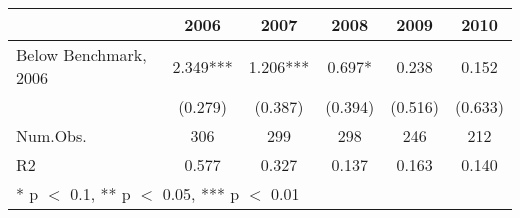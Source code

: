 \begin{table}
\centering
\begin{tabular}[t]{lccccc}
\toprule
  & 2006 & 2007 & 2008 & 2009 & 2010\\
\midrule
Below Benchmark, 2006 & \num{2.349}*** & \num{1.206}*** & \num{0.697}* & \num{0.238} & \num{0.152}\\
 & (\num{0.279}) & (\num{0.387}) & (\num{0.394}) & (\num{0.516}) & (\num{0.633})\\
\midrule
Num.Obs. & \num{306} & \num{299} & \num{298} & \num{246} & \num{212}\\
R2 & \num{0.577} & \num{0.327} & \num{0.137} & \num{0.163} & \num{0.140}\\
\bottomrule
\multicolumn{6}{l}{\rule{0pt}{1em}* p $<$ 0.1, ** p $<$ 0.05, *** p $<$ 0.01}\\
\end{tabular}
\end{table}
